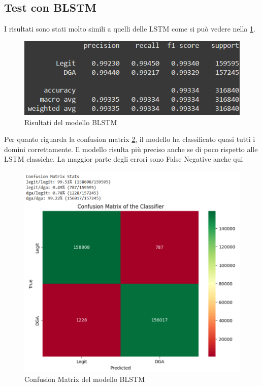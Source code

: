 \documentclass[12pt,a4paper,openright,twoside]{book}
\begin{document}
\subsection{Test con BLSTM}
I risultati sono stati molto simili a quelli delle LSTM come si può vedere nella \cref{fig:BLSTM results}.

\begin{figure}[H]
    \centering
    \includegraphics[width=.8\linewidth]{figures/BLSTM_results.png}
    \caption{Risultati del modello BLSTM}
    \label{fig:BLSTM results}
\end{figure}

\noindent Per quanto riguarda la confusion matrix \ref{fig:BLSTM confusion matrix}, il modello ha classificato
quasi tutti i domini correttamente. Il modello risulta più preciso anche se di poco rispetto alle LSTM classiche.
La maggior parte degli errori sono False Negative anche qui
\begin{figure}[H]
    \centering
    \includegraphics[width=.8\linewidth]{figures/BLSTM conf_matr.png}
    \caption{Confusion Matrix del modello BLSTM}
    \label{fig:BLSTM confusion matrix}
\end{figure}
\end{document}
